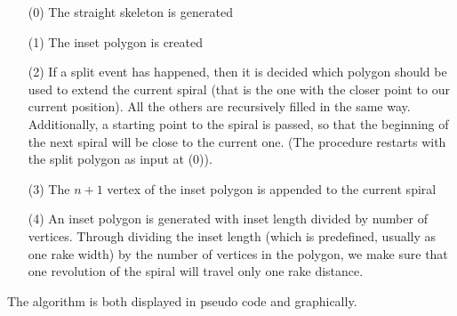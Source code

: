 \begin{itemize}
\item[(0)] The straight skeleton is generated
\item[(1)] The inset polygon is created
\item[(2)] If a split event has happened, then it is decided which polygon should be used to extend the current spiral (that is the one with the closer point to our current position). All the others are recursively filled in the same way. Additionally, a starting point to the spiral is passed, so that the beginning of the next spiral will be close to the current one. (The procedure restarts with the split polygon as input at (0)).
\item[(3)] The $n+1$ vertex of the inset polygon is appended to the current spiral
\item[(4)] An inset polygon is generated with inset length divided by number of vertices. Through dividing the inset length (which is predefined, usually as one rake width) by the number of vertices in the polygon, we make sure that one revolution of the spiral will travel only one rake distance.

\end{itemize}


The algorithm is both displayed in pseudo code and graphically. 


